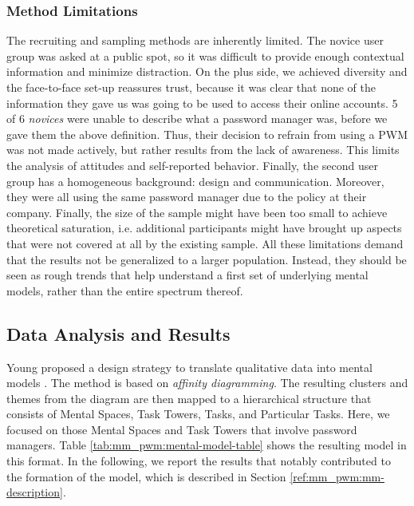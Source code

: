\subsubsection{Method Limitations}
The recruiting and sampling methods are inherently limited. The novice user group was asked at a public spot, so it was difficult to provide enough contextual information and minimize distraction. On the plus side, we achieved diversity and the face-to-face set-up reassures trust, because it was clear that none of the information they gave us was going to be used to access their online accounts. 5 of 6 \textit{novices} were unable to describe what a password manager was, before we gave them the above definition. Thus, their decision to refrain from using a \gls{PWM} was not made actively, but rather results from the lack of awareness. This limits the analysis of attitudes and self-reported behavior. Finally, the second user group has a homogeneous background: design and communication. Moreover, they were all using the same password manager due to the policy at their company. Finally, the size of the sample might have been too small to achieve theoretical saturation, i.e. additional participants might have brought up aspects that were not covered at all by the existing sample. All these limitations demand that the results not be generalized to a larger population. Instead, they should be seen as rough trends that help understand a first set of underlying mental models, rather than the entire spectrum thereof.



\subsection{Data Analysis and Results}
Young proposed a design strategy to translate qualitative data into mental models \cite{Young2008}. The method is based on \textit{affinity diagramming}. The resulting clusters and themes from the diagram are then mapped to a hierarchical structure that consists of Mental Spaces, Task Towers, Tasks, and Particular Tasks. Here, we focused on those Mental Spaces and Task Towers that involve password managers. Table \ref{tab:mm_pwm:mental-model-table} shows the resulting model in this format. In the following, we report the results that notably contributed to the formation of the model, which is described in Section \ref{ref:mm_pwm:mm-description}.



